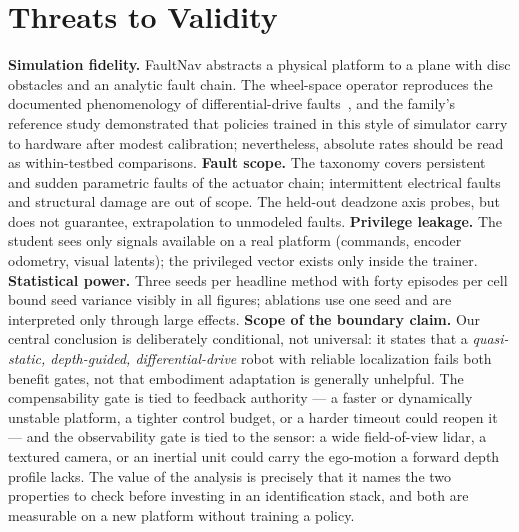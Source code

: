 \documentclass[journal]{IEEEtran}
\begin{document}
\section{Threats to Validity}\label{sec:threats}
\textbf{Simulation fidelity.} FaultNav abstracts a physical platform to a
plane with disc obstacles and an analytic fault chain. The wheel-space
operator reproduces the documented phenomenology of differential-drive
faults~\cite{Borenstein1996UMBmark,Visser2004SlipDetection}, and the
family's reference study demonstrated that policies trained in this style of
simulator carry to hardware after modest calibration; nevertheless, absolute
rates should be read as within-testbed comparisons. \textbf{Fault scope.}
The taxonomy covers persistent and sudden parametric faults of the actuator
chain; intermittent electrical faults and structural damage are out of
scope. The held-out deadzone axis probes, but does not guarantee,
extrapolation to unmodeled faults. \textbf{Privilege leakage.} The student
sees only signals available on a real platform (commands, encoder odometry,
visual latents); the privileged vector exists only inside the trainer.
\textbf{Statistical power.} Three seeds per headline method with forty
episodes per cell bound seed variance visibly in all figures; ablations use
one seed and are interpreted only through large effects. \textbf{Scope of the
boundary claim.} Our central conclusion is deliberately conditional, not
universal: it states that a \emph{quasi-static, depth-guided, differential-drive}
robot with reliable localization fails both benefit gates, not that embodiment
adaptation is generally unhelpful. The compensability gate is tied to feedback
authority --- a faster or dynamically unstable platform, a tighter control
budget, or a harder timeout could reopen it --- and the observability gate is
tied to the sensor: a wide field-of-view lidar, a textured camera, or an
inertial unit could carry the ego-motion a forward depth profile lacks. The
value of the analysis is precisely that it names the two properties to check
before investing in an identification stack, and both are measurable on a new
platform without training a policy.
\end{document}
